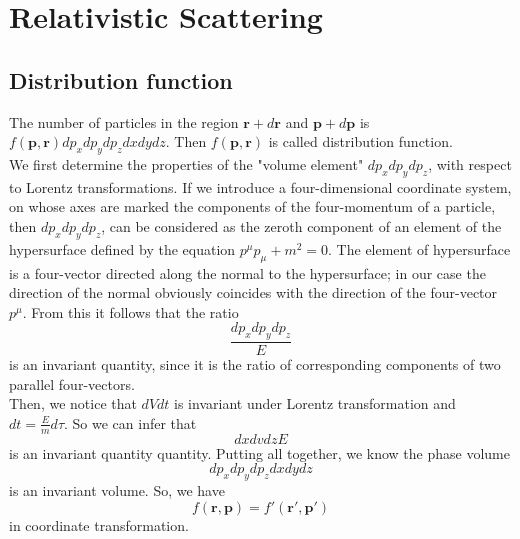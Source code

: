 \section{Relativistic Scattering}
\subsection{Distribution function}
The number of particles in the region $\bm{r}+d\bm{r}$ and $\bm{p} + d\bm{p}$ is $f(\bm{p},\bm{r})dp_x dp_y dp_z dx dy dz$. Then  $f(\bm{p},\bm{r})$ is called distribution function.\\
We first determine the properties of the "volume element" $dp_x dp_y dp_z$, with respect to Lorentz transformations. If we introduce a four-dimensional coordinate system, on whose axes are marked the components of the four-momentum of a particle, then $dp_x dp_y dp_z$, can be considered as the zeroth component of an element of the hypersurface defined by the equation $p^{\mu}p_{\mu} + m^2 = 0$. The element of hypersurface is a four-vector directed along the normal to the hypersurface; in our case the direction of the normal obviously coincides with the direction of the four-vector $p^{\mu}$. From this it follows that the ratio
\[\frac{dp_x dp_y dp_z}{E}\]
is an invariant quantity, since it is the ratio of corresponding components of two parallel four-vectors.\\
Then, we notice that $dVdt$ is invariant under Lorentz transformation and $dt = \frac{E}{m} d\tau $. So we can infer that
\[dx dv dz E\]
is an invariant quantity quantity. Putting all together, we know the phase volume
\[dp_x dp_y dp_z dx dy dz\]
is an invariant volume. So, we have
\[f(\bm{r},\bm{p}) = f'(\bm{r}',\bm{p}')\]
in coordinate transformation.

